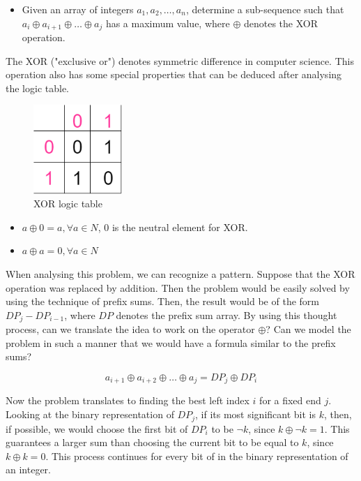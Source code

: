 \documentclass[letterpaper]{article}
\begin{document}
\begin{itemize}
    \item Given an array of integers $a_1, a_2, \dots, a_n$, determine a sub-sequence such that $a_i \oplus a_{i + 1} \oplus \dots \oplus a_j$ has a maximum value, where $\oplus$ denotes the XOR operation.
\end{itemize}

The XOR ("exclusive or") denotes symmetric difference in computer science. This operation also has some special properties that can be deduced after analysing the logic table.

\begin{figure} [h!]
\centering
\includegraphics[width=0.3\textwidth]{pngOfDiagrams/xorgate.png}
\caption{XOR logic table}
\end{figure}

\begin{itemize}
    \item $a \oplus 0 = a, \forall a \in {N}$, 0 is the neutral element for XOR.
    \item $a \oplus a = 0, \forall a \in {N}$
\end{itemize}

When analysing this problem, we can recognize a pattern. Suppose that the XOR operation was replaced by addition. Then the problem would be easily solved by using the technique of prefix sums. Then, the result would be of the form $DP_{j} - DP_{i - 1}$, where $DP$ denotes the prefix sum array. By using this thought process, can we translate the idea to work on the operator $\oplus$? Can we model the problem in such a manner that we would have a formula similar to the prefix sums? 

$$
a_{i + 1} \oplus a_{i + 2} \oplus \dots \oplus a_j = DP_j \oplus DP_i
$$

Now the problem translates to finding the best left index $i$ for a fixed end $j$. Looking at the binary representation of $DP_j$, if its most significant bit is $k$, then, if possible, we would choose the first bit of $DP_i$ to be $\neg k$, since $k \oplus \neg k = 1$. This guarantees a larger sum than choosing the current bit to be equal to $k$, since $k \oplus k = 0$. This process continues for every bit of in the binary representation of an integer.
\end{document}
